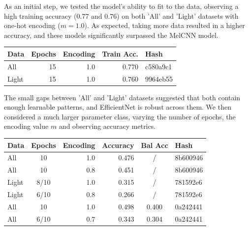 \documentclass[11pt]{article}
\begin{document}
\begin{minipage}{0.48\linewidth}
  As an initial step, we tested the model's ability to fit to the data, observing a high training accuracy ($0.77$ and $0.76$) on both 'All' and 'Light' datasets with one-hot encoding ($m=1.0$). As expected, taking more data resulted in a higher accuracy, and these models significantly surpassed the MelCNN model.
\end{minipage}
\hfill
\begin{minipage}{0.48\linewidth}
  \centering
  \begin{tabular}{|l|r|r|r|l|}
    \hline
    \textbf{Data} & \textbf{Epochs} & \textbf{Encoding} & \textbf{Train Acc.} & \textbf{Hash} \\
    \hline
    All   & 15 & 1.0 & 0.770 & c580a9c1 \\
    Light & 15 & 1.0 & 0.760 & 9964eb55 \\
    \hline
  \end{tabular}
\end{minipage}

The small gaps between 'All' and 'Light' datasets suggested that both contain enough learnable patterns, and EfficientNet is robust across them. We then considered a much larger parameter class, varying the number of epochs, the encoding value $m$ and observing accuracy metrics.

\begin{table}[h!]
  \centering
  \begin{tabular}{|l|c|r|r|c|l|}
    \hline
    Data  & Epochs & Encoding & Accuracy & Bal Acc & Hash     \\
    \hline
    All   & 10     & 1.0      & 0.476    & /       & 8b600946 \\
    All   & 10     & 0.8      & 0.451    & /       & 8b600946 \\
    Light & 8/10   & 1.0      & 0.315    & /       & 781592e6 \\
    Light & 6/10   & 0.8      & 0.266    & /       & 781592e6 \\
    All   & 10     & 1.0      & 0.498    & 0.400   & 0a242441 \\
    All   & 6/10   & 0.7      & 0.343    & 0.304   & 0a242441 \\
    \hline
  \end{tabular}
  \label{tab:balanced_accuracy}
\end{table}
\end{document}
